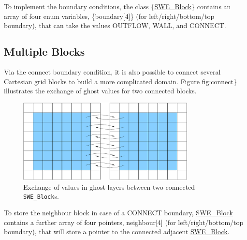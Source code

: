 To implement the boundary conditions, the class \{\hyperlink{classSWE__Block}{S\-W\-E\-\_\-\-Block}\} contains an array of four enum variables, \{boundary\mbox{[}4\mbox{]}\} (for left/right/bottom/top boundary), that can take the values {\ttfamily O\-U\-T\-F\-L\-O\-W}, {\ttfamily W\-A\-L\-L}, and {\ttfamily C\-O\-N\-N\-E\-C\-T}.\hypertarget{index_multblocks}{}\subsection{Multiple Blocks}\label{index_multblocks}
Via the connect boundary condition, it is also possible to connect several Cartesian grid blocks to build a more complicated domain. Figure fig\-:connect\} illustrates the exchange of ghost values for two connected blocks.

  
\begin{figure}
\begin{center}
  \includegraphics[width=0.8\textwidth]{pics/connect.pdf}
\end{center}
\caption{Exchange of values in ghost layers between two connected \texttt{SWE\_Block}s.}
\label{fig:connect}
\end{figure}


To store the neighbour block in case of a {\ttfamily C\-O\-N\-N\-E\-C\-T} boundary, {\ttfamily \hyperlink{classSWE__Block}{S\-W\-E\-\_\-\-Block}} contains a further array of four pointers, {\ttfamily neighbour\mbox{[}4\mbox{]}} (for left/right/bottom/top boundary), that will store a pointer to the connected adjacent {\ttfamily \hyperlink{classSWE__Block}{S\-W\-E\-\_\-\-Block}}.

